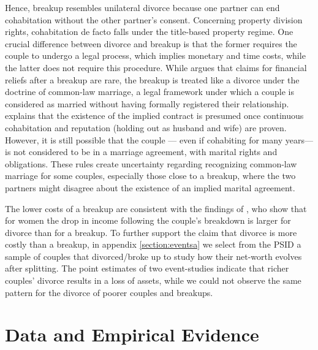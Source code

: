 \documentclass[12pt]{article}
\numberwithin{table}{section}
\begin{document}
Hence, breakup resembles unilateral divorce because one partner can end cohabitation without the other partner's consent. Concerning property division rights, cohabitation de facto falls under the title-based property regime. One crucial difference between divorce and breakup is that the former requires the couple to undergo a legal process, which implies monetary and time costs, while the latter does not require this procedure. While \cite{garrison2008} argues that claims for financial reliefs after a breakup are rare, the breakup is treated like a divorce under the doctrine of common-law marriage, a legal framework under which a couple is considered as married without having formally registered their relationship. \cite{goran2008} explains that the existence of the implied contract is presumed once continuous cohabitation and reputation (holding out as husband and wife) are proven. However, it is still possible that the couple --- even if cohabiting for many years---is not considered to be in a marriage agreement, with marital rights and obligations. These rules create uncertainty regarding recognizing common-law marriage for some couples, especially those close to a breakup, where the two partners might disagree about the existence of an implied marital agreement.

The lower costs of a breakup are consistent with the findings of \cite{avellar2005}, who show that for women the drop in income following the couple's breakdown is larger for divorce than for a breakup. To further support the claim that divorce is more costly than a breakup, in appendix \ref{section:eventsa} we select from the PSID a sample of couples that divorced/broke up to study how their net-worth evolves after splitting. The point estimates of two event-studies indicate that richer couples' divorce results in a loss of assets, while we could not observe the same pattern for the divorce of poorer couples and breakups.


\section{Data and Empirical Evidence}
\end{document}
